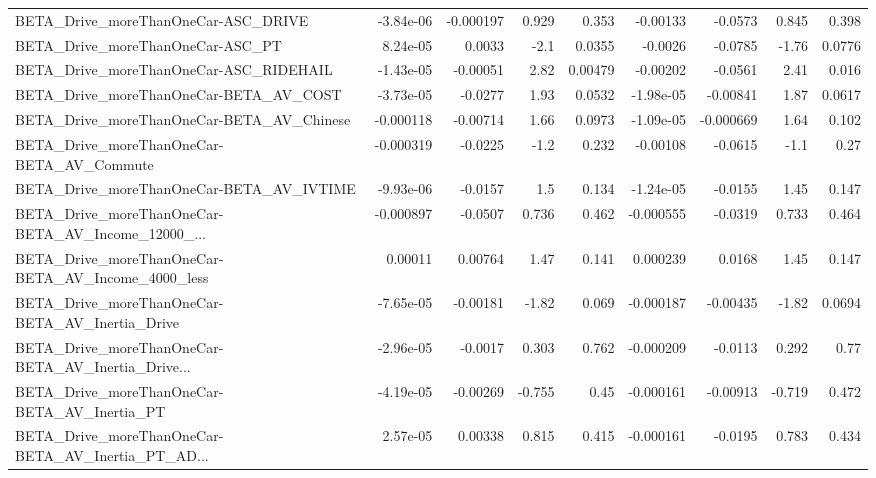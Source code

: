 \begin{tabular}{lrrrrrrrr}
BETA\_Drive\_moreThanOneCar-ASC\_DRIVE                &   -3.84e-06 &    -0.000197 &    0.929 &    0.353 &   -0.00133 &     -0.0573 &        0.845 &         0.398 \\
BETA\_Drive\_moreThanOneCar-ASC\_PT                   &    8.24e-05 &       0.0033 &     -2.1 &   0.0355 &    -0.0026 &     -0.0785 &        -1.76 &        0.0776 \\
BETA\_Drive\_moreThanOneCar-ASC\_RIDEHAIL             &   -1.43e-05 &     -0.00051 &     2.82 &  0.00479 &   -0.00202 &     -0.0561 &         2.41 &         0.016 \\
BETA\_Drive\_moreThanOneCar-BETA\_AV\_COST             &   -3.73e-05 &      -0.0277 &     1.93 &   0.0532 &  -1.98e-05 &    -0.00841 &         1.87 &        0.0617 \\
BETA\_Drive\_moreThanOneCar-BETA\_AV\_Chinese          &   -0.000118 &     -0.00714 &     1.66 &   0.0973 &  -1.09e-05 &   -0.000669 &         1.64 &         0.102 \\
BETA\_Drive\_moreThanOneCar-BETA\_AV\_Commute          &   -0.000319 &      -0.0225 &     -1.2 &    0.232 &   -0.00108 &     -0.0615 &         -1.1 &          0.27 \\
BETA\_Drive\_moreThanOneCar-BETA\_AV\_IVTIME           &   -9.93e-06 &      -0.0157 &      1.5 &    0.134 &  -1.24e-05 &     -0.0155 &         1.45 &         0.147 \\
BETA\_Drive\_moreThanOneCar-BETA\_AV\_Income\_12000\_... &   -0.000897 &      -0.0507 &    0.736 &    0.462 &  -0.000555 &     -0.0319 &        0.733 &         0.464 \\
BETA\_Drive\_moreThanOneCar-BETA\_AV\_Income\_4000\_less &     0.00011 &      0.00764 &     1.47 &    0.141 &   0.000239 &      0.0168 &         1.45 &         0.147 \\
BETA\_Drive\_moreThanOneCar-BETA\_AV\_Inertia\_Drive    &   -7.65e-05 &     -0.00181 &    -1.82 &    0.069 &  -0.000187 &    -0.00435 &        -1.82 &        0.0694 \\
BETA\_Drive\_moreThanOneCar-BETA\_AV\_Inertia\_Drive... &   -2.96e-05 &      -0.0017 &    0.303 &    0.762 &  -0.000209 &     -0.0113 &        0.292 &          0.77 \\
BETA\_Drive\_moreThanOneCar-BETA\_AV\_Inertia\_PT       &   -4.19e-05 &     -0.00269 &   -0.755 &     0.45 &  -0.000161 &    -0.00913 &       -0.719 &         0.472 \\
BETA\_Drive\_moreThanOneCar-BETA\_AV\_Inertia\_PT\_AD... &    2.57e-05 &      0.00338 &    0.815 &    0.415 &  -0.000161 &     -0.0195 &        0.783 &         0.434 \\

\end{tabular}
